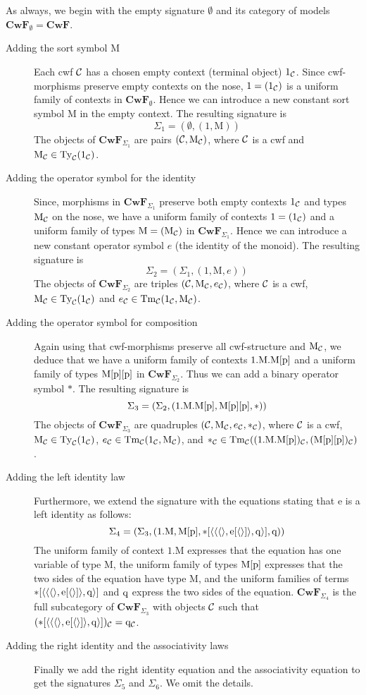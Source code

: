 \documentclass{lmcs}
\def\Cwf{\mathbf{CwF}}
\def\Mon{\mathrm{M}}
\def\idmon{\mathrm{e}}
\def\comp{\mathrm{*}}
\begin{document}
As always, we begin with the empty signature $\emptyset$ and its category of models $\Cwf_\emptyset = \Cwf$.
\begin{description}
\item[Adding the sort symbol $\Mon$] Each cwf ${\mathcal C}$ has a chosen empty context (terminal object) $1_{\mathcal C}$. Since cwf-morphisms preserve empty contexts on the nose, $1 = (1_{\mathcal C})$ is a uniform family of contexts in $\Cwf_\emptyset$. Hence we can introduce a new constant sort symbol $\Mon$ in the empty context. The resulting signature  is
$$
\Sigma_1 = (\emptyset, (1,\Mon))
$$
The objects of $\Cwf_{\Sigma_1}$  are pairs $(\C,\Mon_\C)$, where ${\mathcal C}$ is a cwf and $\Mon_\C \in \Ty_\C(1_\C)$.
\item[Adding the operator symbol for the identity]
Since, morphisms in $\Cwf_{\Sigma_1}$ preserve both empty contexts $1_{\mathcal C}$ and types $\Mon_\C$ on the nose, we have a uniform family of contexts $1 = (1_{\mathcal C})$ and a uniform family of types $\Mon = (\Mon_\C)$ in $\Cwf_{\Sigma_1}$. Hence we can introduce a new constant operator symbol $e$ (the identity of the monoid).  The resulting signature  is
$$
\Sigma_2 = (\Sigma_1, (1,\Mon,e))
$$
The objects of $\Cwf_{\Sigma_2}$  are triples $(\C,\Mon_\C,e_\C)$, where ${\mathcal C}$ is a cwf, $\Mon_\C \in \Ty_\C(1_\C)$ and $e_\C \in \Tm_\C(1_\C,\Mon_\C)$.
\item[Adding the operator symbol for composition]
Again using that cwf-morphisms preserve all cwf-structure and $\Mon_\C$, we deduce that we have a uniform family of contexts $1.\Mon.\Mon[\p]$ and a uniform family of types $\Mon[\p][\p]$ in $\Cwf_{\Sigma_2}$. Thus we can add a binary operator symbol $\comp$. The resulting signature is
$$
\Sigma_3 = (\Sigma_2, (1.\Mon.\Mon[\p],\Mon[\p][\p],\comp))
$$
The objects of $\Cwf_{\Sigma_3}$  are quadruples $(\C,\Mon_\C,e_\C,*_\C)$, where ${\mathcal C}$ is a cwf, $\Mon_\C \in \Ty_\C(1_\C)$, $e_\C \in \Tm_\C(1_\C,\Mon_\C)$, and $*_\C \in \Tm_\C((1.\Mon.\Mon[\p])_\C,(\Mon[\p][\p])_\C)$.
\item[Adding the left identity law]
Furthermore, we extend the signature with the equations stating that $\idmon$ is a left identity as follows:
$$
\Sigma_4 = (\Sigma_3, (1.\Mon, \Mon[\p], \comp[\tuple{\tuple{\tuple{},\idmon[\tuple{}]},\q}], \q))
$$
The uniform family of context $1.\Mon$ expresses that the equation has one variable of type $\Mon$, the uniform family of types $\Mon[\p]$ expresses that the two sides of the equation have type $\Mon$, and the uniform families of terms $\comp[\tuple{\tuple{\tuple{},\idmon[\tuple{}]},\q}]$ and $\mathrm{q}$ express the two sides of the equation.
$\Cwf_{\Sigma_4}$ is the full subcategory of $\Cwf_{\Sigma_3}$ with objects ${\mathcal C}$
such that $(\comp[\tuple{\tuple{\tuple{},\idmon[\tuple{}]},\q}])_\C = \q_\C$.
\item[Adding the right identity and the associativity laws]
Finally we add the right identity equation and the associativity equation to get the signatures $\Sigma_5$ and $\Sigma_6$. We omit the details.
\end{description}
\end{document}
